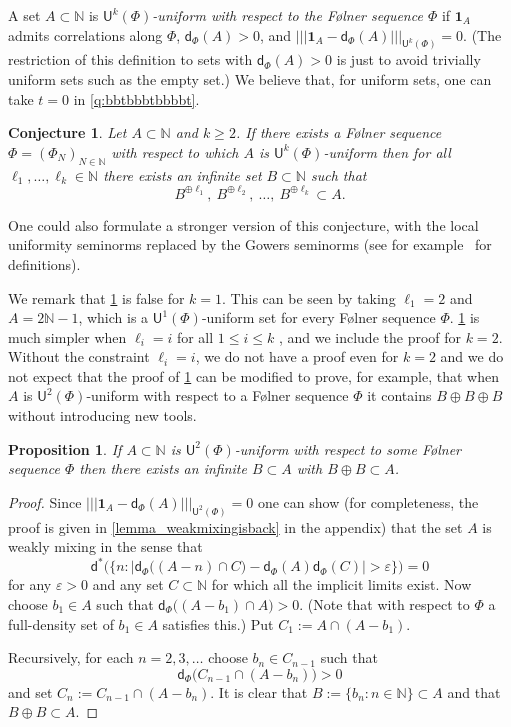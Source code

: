 \documentclass[10pt,dvipsnames]{article}
\newtheorem{proposition}[theorem]{Proposition}
\newtheorem{conjecture}[theorem]{Conjecture}
\theoremstyle{definition}
\theoremstyle{plain}
\newcommand{\define}[1]{\textit{#1}}
\newcommand{\N}{\mathbb{N}}
\newcommand{\dens}{\mathsf{d}}
\newcommand{\ubdens}{\mathsf{d}^*}
\newcommand{\Folner}{F\o{}lner}
\newcommand{\one}{\boldsymbol{1}}
\newcommand{\ghk}{|\!|\!|}
\newcommand{\ghkn}[1]{\ghk {#1} \ghk}
\newcommand{\un}[2]{{\mathsf{U}^{#1}(#2)}}
\begin{document}
A set $A\subset\N$ is \define{$\un{k}{\Phi}$-uniform with respect to the  \Folner{} sequence $\Phi$} if $\one_A$ admits correlations along $\Phi$, $\dens_\Phi(A) > 0$,  and $\ghkn{\one_A-\dens_\Phi(A)}_\un{k}{\Phi}=0$. 
(The restriction of this definition to sets with  $\dens_\Phi(A)>0$ is just to avoid trivially uniform sets such as the empty set.) 
We believe that, for uniform sets, one can take $t=0$ in \cref{q:bbtbbbtbbbbt}.  


\begin{conjecture}
\label{conj_uni_shift}
Let $A\subset\N$ and $k\geq2$. 
If there exists a \Folner{} sequence $\Phi=(\Phi_N)_{N\in\N}$ 
with respect to which $A$ is $\un{k}{\Phi}$-uniform
then for all $\ell_1,\ldots,\ell_k\in\N$ there exists an infinite set $B\subset\N$ such that
\[
B^{\oplus \ell_1},~B^{\oplus \ell_2},~\ldots,~B^{\oplus \ell_k}\subset A.
\]
\end{conjecture} 
One could also formulate a stronger version of this conjecture, with the local uniformity seminorms replaced by the Gowers seminorms (see for example~\cite{Green_Tao08} for definitions).


We remark that \cref{conj_uni_shift} is false for $k=1$. This can be seen by taking $\ell_1=2$ and $A=2\N-1$, which is a $\un{1}{\Phi}$-uniform set for every \Folner{} sequence $\Phi$.
\cref{conj_uni_shift} is much simpler when $\ell_i = i$ for all $1 \le i \le k$ , and we include the proof for $k=2$. 
Without the constraint $\ell_i = i$, we do not have a proof even for $k = 2$ and we do not expect that the proof of \cref{prop_U2_implies_no_shift_needed}  can be modified to prove, for example, that when $A$ is $\un{2}{\Phi}$-uniform with respect to a \Folner{} sequence $\Phi$ it contains $B \oplus B \oplus B$ without introducing new tools. 

\begin{proposition}
\label{prop_U2_implies_no_shift_needed}
    If $A\subset\N$ is $\un{2}{\Phi}$-uniform with respect to some \Folner{} sequence $\Phi$ then there exists an infinite $B\subset A$ with $B\oplus B\subset A$.
\end{proposition}

\begin{proof}
Since $\ghkn{\one_A-\dens_
    \Phi(A)}_\un{2}{\Phi}=0$ one can show (for completeness, the proof is given in \cref{lemma_weakmixingisback} in the appendix) that the set $A$ is weakly mixing in the sense that
\[
\ubdens\Big(\Big\{n:\big|\dens_\Phi\big((A-n)\cap C\big)-\dens_\Phi(A)\dens_\Phi(C)\big|>\varepsilon\Big\}\Big)=0
\]
for any $\varepsilon>0$ and any set $C\subset\N$ for which all the implicit limits exist. 
Now choose $b_1\in A$ such that $\dens_\Phi\big((A-b_1)\cap A\big)>0$.
(Note that with respect to $\Phi$ a full-density set of $b_1\in A$ satisfies this.)
Put $C_1:=A\cap(A-b_1)$.  

Recursively, for each $n=2,3,\dots$ choose $b_n\in C_{n-1}$ such that
\[
\dens_\Phi\big(C_{n-1}\cap(A-b_n)\big)>0
\]
and set  $C_n:=C_{n-1}\cap(A-b_n)$.
It is clear that $B:=\{b_n:n\in\N\}\subset A$ and that $B\oplus B\subset A$.
\end{proof}
\end{document}
